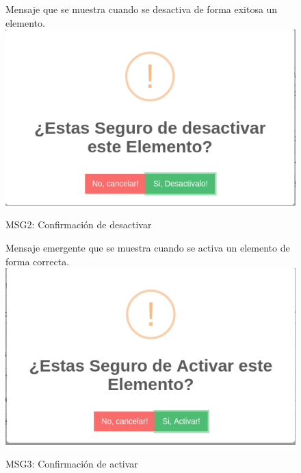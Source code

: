 \begin{figure}[htbp!]
	\begin{center}
	Mensaje que se muestra cuando se desactiva de forma exitosa un elemento.
		\includegraphics[scale=.5]{Pantallas/ConfirmacionDesactivar}
		\caption{MSG2: Confirmación de desactivar}
	\end{center}
\end{figure}

\begin{figure}[htbp!]
	\begin{center}
	Mensaje emergente que se muestra cuando se activa un elemento de forma correcta.
		\includegraphics[scale=.5]{Pantallas/ConfirmacionActivar}
		\caption{MSG3: Confirmación de activar}
	\end{center}
\end{figure}

